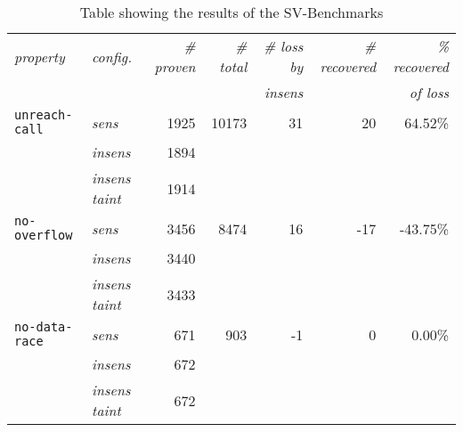       \begin{table}
        \centering
        \begin{tabular}{l|l||r|r||r|r|r}
          \textit{property} & \textit{config.} & \textit{\# proven} & \textit{\# total} & \textit{\# loss by} & \textit{\# recovered} & \textit{\% recovered}\\
            &  &  &  & \textit{insens} & & \textit{of loss}\\
          \hline
          \texttt{unreach-call} & \textit{sens} & 1925 & 10173 & 31 & 20 & 64.52\%\\
          & \textit{insens} & 1894 & & & & \\
          & \textit{insens taint} & 1914 & & & & \\
          \hline
          \texttt{no-overflow} & \textit{sens} & 3456 & 8474 & 16 & -17 & -43.75\%\\
          & \textit{insens} & 3440 & & & & \\
          & \textit{insens taint} & 3433 & & & & \\
          \hline
          \texttt{no-data-race} & \textit{sens} & 671 & 903 & -1 & 0 & 0.00\%\\
          & \textit{insens} & 672 & & & & \\
          & \textit{insens taint} & 672 & & & & \\
          \hline
        \end{tabular}
        \caption{Table showing the results of the SV-Benchmarks}
        \label{tbl:resultSVbench}
      \end{table}

